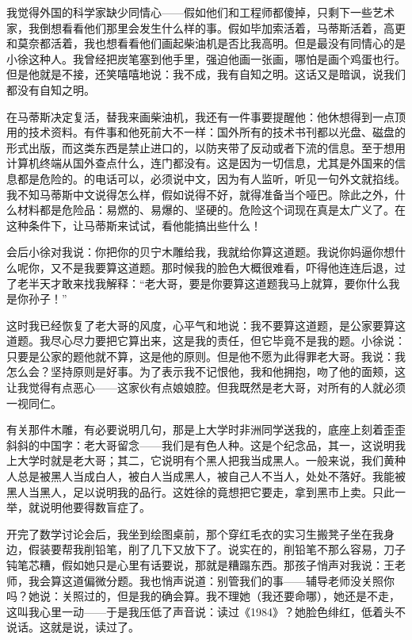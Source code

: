 我觉得外国的科学家缺少同情心——假如他们和工程师都傻掉，只剩下一些艺术家，我倒想看看他们那里会发生什么样的事。假如毕加索活着，马蒂斯活着，高更和莫奈都活着，我也想看看他们画起柴油机是否比我高明。但是最没有同情心的是小徐这种人。我曾经把炭笔塞到他手里，强迫他画一张画，哪怕是画个鸡蛋也行。但是他就是不接，还笑嘻嘻地说：我不成，我有自知之明。这话又是暗讽，说我们都没有自知之明。 

在马蒂斯决定复活，替我来画柴油机，我还有一件事要提醒他：他休想得到一点顶用的技术资料。有件事和他死前大不一样：国外所有的技术书刊都以光盘、磁盘的形式出版，而这类东西是禁止进口的，以防夹带了反动或者下流的信息。至于想用计算机终端从国外查点什么，连门都没有。这是因为一切信息，尤其是外国来的信息都是危险的。的电话可以，必须说中文，因为有人监听，听见一句外文就掐线。我不知马蒂斯中文说得怎么样，假如说得不好，就得准备当个哑巴。除此之外，什么材料都是危险品：易燃的、易爆的、坚硬的。危险这个词现在真是太广义了。在这种条件下，让马蒂斯来试试，看他能搞出些什么！ 



会后小徐对我说：你把你的贝宁木雕给我，我就给你算这道题。我说你妈逼你想什么呢你，又不是我要算这道题。那时候我的脸色大概很难看，吓得他连连后退，过了老半天才敢来找我解释：“老大哥，要是你要算这道题我马上就算，要你什么我是你孙子！” 

这时我已经恢复了老大哥的风度，心平气和地说：我不要算这道题，是公家要算这道题。我尽心尽力要把它算出来，这是我的责任，但它毕竟不是我的题。小徐说：只要是公家的题他就不算，这是他的原则。但是他不愿为此得罪老大哥。我说：我怎么会？坚持原则是好事。为了表示我不记恨他，我和他拥抱，吻了他的面颊，这让我觉得有点恶心——这家伙有点娘娘腔。但我既然是老大哥，对所有的人就必须一视同仁。 

有关那件木雕，有必要说明几句，那是上大学时非洲同学送我的，底座上刻着歪歪斜斜的中国字：老大哥留念——我们是有色人种。这是个纪念品，其一，这说明我上大学时就是老大哥；其二，它说明有个黑人把我当成黑人。一般来说，我们黄种人总是被黑人当成白人，被白人当成黑人，被自己人不当人，处处不落好。我能被黑人当黑人，足以说明我的品行。这姓徐的竟想把它要走，拿到黑市上卖。只此一举，就说明他要得数盲症了。 



开完了数学讨论会后，我坐到绘图桌前，那个穿红毛衣的实习生搬凳子坐在我身边，假装要帮我削铅笔，削了几下又放下了。说实在的，削铅笔不那么容易，刀子钝笔芯糟，假如她只是心里有话要说，那就是糟蹋东西。那孩子悄声对我说：王老师，我会算这道偏微分题。我也悄声说道：别管我们的事——辅导老师没关照你吗？她说：关照过的，但是我的确会算。我不理她（我还要命哪），她还是不走，这叫我心里一动——于是我压低了声音说：读过《1984》？她脸色绯红，低着头不说话。这就是说，读过了。 

